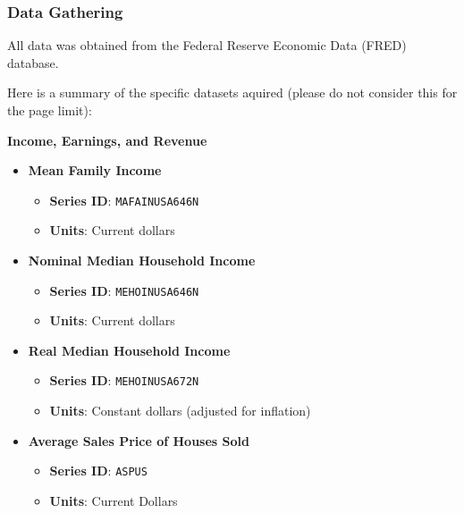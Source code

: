 \documentclass{article}
\begin{document}
\subsubsection{Data Gathering}

All data was obtained from the Federal Reserve Economic Data (FRED) database. 

Here is a summary of the specific datasets aquired (please do not consider this for the page limit):

\textbf{Income, Earnings, and Revenue}
\begin{itemize} 
  \item \textbf{Mean Family Income} 
  \begin{itemize} 
    \item \textbf{Series ID}: \texttt{MAFAINUSA646N} 
    \item \textbf{Units}: Current dollars 
  \end{itemize}

  \item \textbf{Nominal Median Household Income} 
  \begin{itemize} 
    \item \textbf{Series ID}: \texttt{MEHOINUSA646N} 
    \item \textbf{Units}: Current dollars 
  \end{itemize}

  \item \textbf{Real Median Household Income}
  \begin{itemize}
      \item \textbf{Series ID}: \texttt{MEHOINUSA672N}
      \item \textbf{Units}: Constant dollars (adjusted for inflation)
  \end{itemize}

  \item \textbf{Average Sales Price of Houses Sold}
  \begin{itemize}
      \item \textbf{Series ID}: \texttt{ASPUS}
      \item \textbf{Units}: Current Dollars
  \end{itemize}
\end{itemize}
\end{document}
